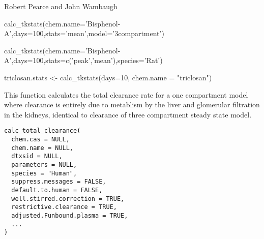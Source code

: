 \documentclass[a4paper]{book}
\begin{document}
%
\begin{Author}\relax
Robert Pearce and John Wambaugh
\end{Author}
%
\begin{Examples}
\begin{ExampleCode}

calc_tkstats(chem.name='Bisphenol-A',days=100,stats='mean',model='3compartment')


calc_tkstats(chem.name='Bisphenol-A',days=100,stats=c('peak','mean'),species='Rat')

triclosan.stats <- calc_tkstats(days=10, chem.name = "triclosan")


\end{ExampleCode}
\end{Examples}
%
\begin{Description}\relax
This function calculates the total clearance rate for a one compartment model
where clearance is entirely due to metablism by the liver and glomerular
filtration in the kidneys, identical to clearance of three compartment
steady state model.
\end{Description}
%
\begin{Usage}
\begin{verbatim}
calc_total_clearance(
  chem.cas = NULL,
  chem.name = NULL,
  dtxsid = NULL,
  parameters = NULL,
  species = "Human",
  suppress.messages = FALSE,
  default.to.human = FALSE,
  well.stirred.correction = TRUE,
  restrictive.clearance = TRUE,
  adjusted.Funbound.plasma = TRUE,
  ...
)
\end{verbatim}
\end{Usage}
%
\end{document}
